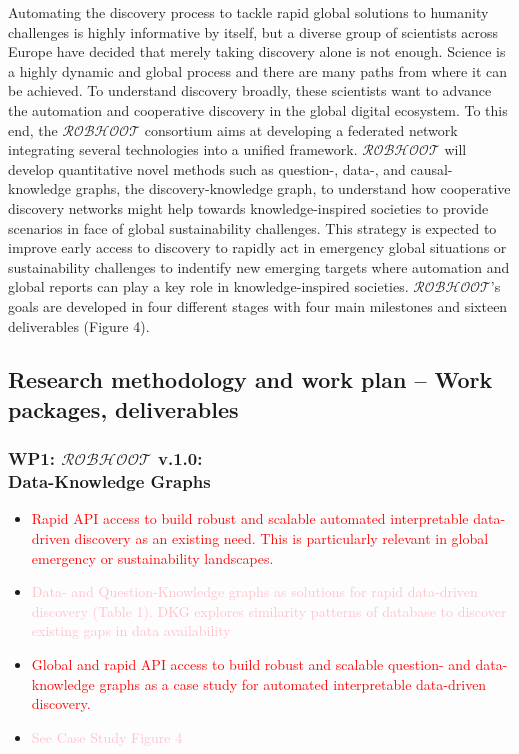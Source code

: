 \documentclass[11pt, a4paper]{article} %
\begin{document}
Automating the discovery process to tackle rapid global solutions to
humanity challenges is highly informative by itself, but a diverse
group of scientists across Europe have decided that merely taking
discovery alone is not enough. Science is a highly dynamic and global
process and there are many paths from where it can be achieved. To
understand discovery broadly, these scientists want to advance the
automation and cooperative discovery in the global digital
ecosystem. To this end, the $\mathcal{ROBHOOT}$ consortium aims at
developing a federated network integrating several technologies into a
unified framework. $\mathcal{ROBHOOT}$ will develop quantitative novel
methods such as question-, data-, and causal-knowledge graphs, the
discovery-knowledge graph, to understand how cooperative discovery
networks might help towards knowledge-inspired societies to provide
scenarios in face of global sustainability challenges. This strategy
is expected to improve early access to discovery to rapidly act in
emergency global situations or sustainability challenges to indentify
new emerging targets where automation and global reports can play a
key role in knowledge-inspired societies. $\mathcal{ROBHOOT}$'s goals
are developed in four different stages with four main milestones and
sixteen deliverables (Figure 4).

  
\subsection{Research methodology and work plan – Work packages,
  deliverables}


\subsubsection{{\bf WP1: $\mathcal{ROBHOOT}$ v.1.0}: \\ Data-Knowledge Graphs}

\begin{itemize}
      \item \textcolor{red}{Rapid API access to build
          robust and scalable automated interpretable data-driven
          discovery as an existing need. This is particularly relevant
          in global emergency or sustainability landscapes.}
      \item \textcolor{pink}{Data- and Question-Knowledge graphs as
          solutions for rapid data-driven discovery (Table 1). DKG
          explores similarity patterns of database to discover
          existing gaps in data availability}
      \item \textcolor{red}{Global and rapid API access to build
          robust and scalable question- and data-knowledge graphs as a
          case study for automated interpretable data-driven
          discovery.}
      \item \textcolor{pink}{See Case Study Figure 4}
      \end{itemize}
      
\end{document}
